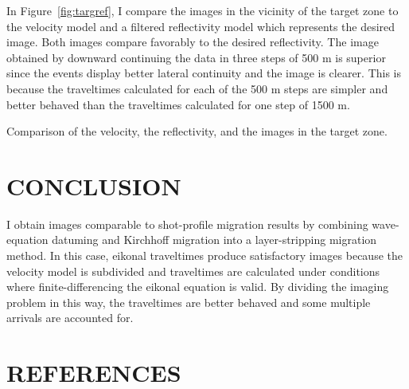 In Figure~\ref{fig:targref}, I compare the images in the vicinity
of the target zone to the velocity model and a filtered reflectivity
model which represents the desired image.
Both images compare favorably to the desired reflectivity.
The image obtained by downward continuing the data in three steps
of 500 m is superior since the events display 
better lateral continuity and the image is clearer.
This is because the traveltimes calculated for each of the 500 m steps
are simpler and better behaved than the traveltimes calculated
for one step of 1500 m.


{Comparison of the velocity, the reflectivity, and the images in the
target zone.}

\section{CONCLUSION}
I obtain images comparable to shot-profile migration results by 
combining wave-equation datuming and Kirchhoff migration into
a layer-stripping migration method. In this case, eikonal traveltimes produce
satisfactory images because the velocity model is subdivided 
and traveltimes are calculated 
under conditions where finite-differencing the eikonal equation is valid.
By dividing the imaging problem in this
way, the traveltimes are better behaved and some multiple arrivals
are accounted for.

\section{REFERENCES}






